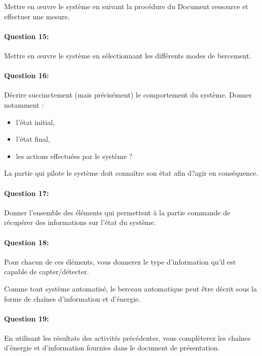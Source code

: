 
Mettre en \oe uvre le système en suivant la procédure du Document ressource et effectuer une mesure.


\paragraph{Question 15:} Mettre en \oe uvre le système en sélectionnant les différents modes de bercement.

\paragraph{Question 16:} Décrire succinctement (mais précisément) le comportement du système. Donner notamment :
\begin{itemize}
 \item l'état initial,
 \item l'état final,
 \item les actions effectuées par le système ?
\end{itemize}


La partie qui pilote le système doit connaître son état afin d?agir en conséquence.

\paragraph{Question 17:} Donner l'ensemble des éléments qui permettent à la partie commande de récupérer des informations sur l'état du système.

\paragraph{Question 18:} Pour chacun de ces éléments, vous donnerez le type d'information qu'il est capable de capter/détecter. 


Comme tout système automatisé, le berceau automatique peut être décrit sous la forme de chaînes d'information et d'énergie. 

\paragraph{Question 19:} En utilisant les résultats des activités précédentes, vous complèterez les chaînes d'énergie et d'information fournies dans le document de présentation. 

